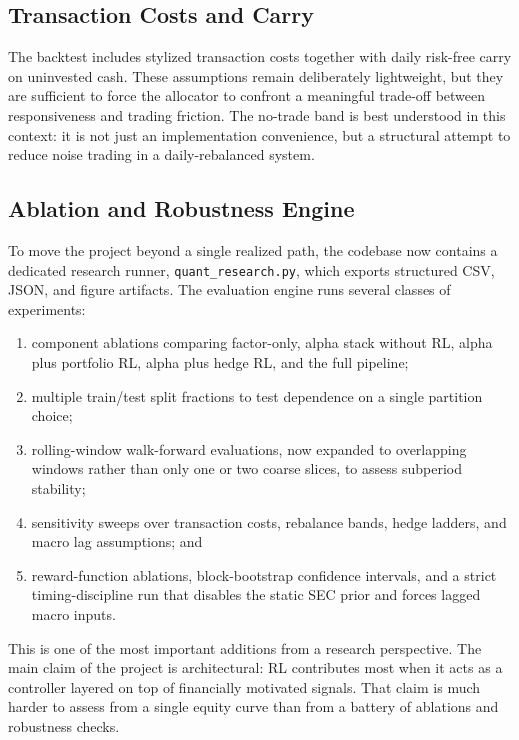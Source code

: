 \documentclass[11pt]{article}
\begin{document}
\subsection{Transaction Costs and Carry}

The backtest includes stylized transaction costs together with daily risk-free
carry on uninvested cash. These assumptions remain deliberately lightweight, but
they are sufficient to force the allocator to confront a meaningful trade-off
between responsiveness and trading friction. The no-trade band is best
understood in this context: it is not just an implementation convenience, but a
structural attempt to reduce noise trading in a daily-rebalanced system.

\subsection{Ablation and Robustness Engine}

To move the project beyond a single realized path, the codebase now contains a
dedicated research runner, \texttt{quant\_research.py}, which exports structured
CSV, JSON, and figure artifacts. The evaluation engine runs several classes of
experiments:
\begin{enumerate}[leftmargin=1.5em, itemsep=2pt, topsep=4pt]
\item component ablations comparing factor-only, alpha stack without RL,
      alpha plus portfolio RL, alpha plus hedge RL, and the full pipeline;
\item multiple train/test split fractions to test dependence on a single
      partition choice;
\item rolling-window walk-forward evaluations, now expanded to overlapping
      windows rather than only one or two coarse slices, to assess subperiod
      stability;
\item sensitivity sweeps over transaction costs, rebalance bands, hedge ladders,
      and macro lag assumptions; and
\item reward-function ablations, block-bootstrap confidence intervals, and a
      strict timing-discipline run that disables the static SEC prior and
      forces lagged macro inputs.
\end{enumerate}

This is one of the most important additions from a research perspective. The
main claim of the project is architectural: RL contributes most when it acts as
a controller layered on top of financially motivated signals. That claim is much
harder to assess from a single equity curve than from a battery of ablations and
robustness checks.
\end{document}
